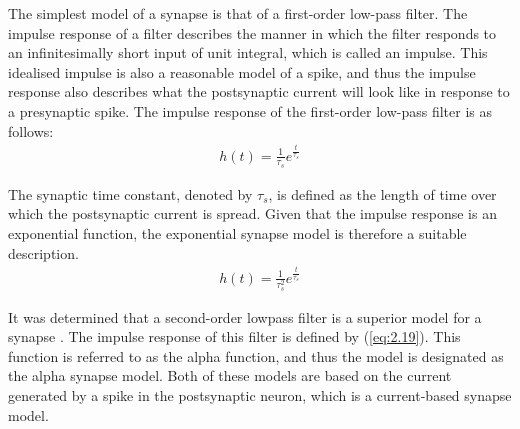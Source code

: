 \noindent The simplest model of a synapse is that of a first-order low-pass filter. The impulse response of a filter describes the manner in which the filter responds to an infinitesimally short input of unit integral, which is called an impulse. This idealised impulse is also a reasonable model of a spike, and thus the impulse response also describes what the postsynaptic current will look like in response to a presynaptic spike. The impulse response of the first-order low-pass filter is as follows:
\begin{align}
h(t) = \frac{1}{\tau_s}e^{\frac{t}{\tau_s}} \label{eq:2.18} 
\end{align}

\noindent The synaptic time constant, denoted by $\tau_s$, is defined as the length of time over which the postsynaptic current is spread. Given that the impulse response is an exponential function, the exponential synapse model is therefore a suitable description.
\begin{align}
h(t) = \frac{1}{\tau_s^2}e^{\frac{t}{\tau_s}} \label{eq:2.19} 
\end{align}

\noindent It was determined that a second-order lowpass filter is a superior model for a synapse \cite{mainen1995reliability}. The impulse response of this filter is defined by (\ref{eq:2.19}). This function is referred to as the alpha function, and thus the model is designated as the alpha synapse model. Both of these models are based on the current generated by a spike in the postsynaptic neuron, which is a current-based synapse model.\\





